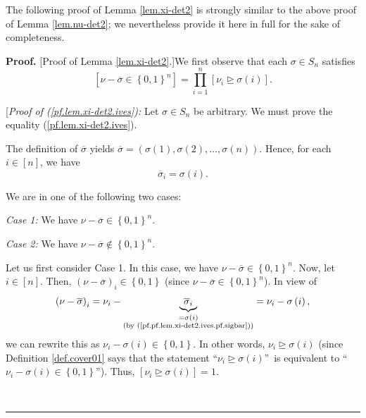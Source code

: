 \documentclass
[numbers=enddot,12pt,final,onecolumn,notitlepage,english]{scrartcl}%
\theoremstyle{definition}
\newenvironment{proof}[1][Proof]{\noindent\textbf{#1.} }{\ \rule{0.5em}{0.5em}}
\let\prodnonlimits\prod
\renewcommand{\prod}{\prodnonlimits\limits}
\newenvironment{verlong}{}{}
\begin{document}
\begin{verlong}
The following proof of Lemma \ref{lem.xi-det2} is strongly similar to the
above proof of Lemma \ref{lem.nu-det2}; we nevertheless provide it here in
full for the sake of completeness.

\begin{proof}
[Proof of Lemma \ref{lem.xi-det2}.]We first observe that each $\sigma\in
S_{n}$ satisfies%
\begin{equation}
\left[  \nu-\overline{\sigma}\in\left\{  0,1\right\}  ^{n}\right]
=\prod_{i=1}^{n}\left[  \nu_{i}\trianglerighteq\sigma\left(  i\right)
\right]  . \label{pf.lem.xi-det2.ives}%
\end{equation}


[\textit{Proof of (\ref{pf.lem.xi-det2.ives}):} Let $\sigma\in S_{n}$ be
arbitrary. We must prove the equality (\ref{pf.lem.xi-det2.ives}).

The definition of $\overline{\sigma}$ yields $\overline{\sigma}=\left(
\sigma\left(  1\right)  ,\sigma\left(  2\right)  ,\ldots,\sigma\left(
n\right)  \right)  $. Hence, for each $i\in\left[  n\right]  $, we have%
\begin{equation}
\overline{\sigma}_{i}=\sigma\left(  i\right)  .
\label{pf.pf.lem.xi-det2.ives.pf.sigbar}%
\end{equation}


We are in one of the following two cases:

\textit{Case 1:} We have $\nu-\overline{\sigma}\in\left\{  0,1\right\}  ^{n}$.

\textit{Case 2:} We have $\nu-\overline{\sigma}\notin\left\{  0,1\right\}
^{n}$. \medskip

Let us first consider Case 1. In this case, we have $\nu-\overline{\sigma}%
\in\left\{  0,1\right\}  ^{n}$. Now, let $i\in\left[  n\right]  $. Then,
$\left(  \nu-\overline{\sigma}\right)  _{i}\in\left\{  0,1\right\}  $ (since
$\nu-\overline{\sigma}\in\left\{  0,1\right\}  ^{n}$). In view of
\[
\left(  \nu-\overline{\sigma}\right)  _{i}=\nu_{i}-\underbrace{\overline
{\sigma}_{i}}_{\substack{=\sigma\left(  i\right)  \\\text{(by
(\ref{pf.pf.lem.xi-det2.ives.pf.sigbar}))}}}=\nu_{i}-\sigma\left(  i\right)
,
\]
we can rewrite this as $\nu_{i}-\sigma\left(  i\right)  \in\left\{
0,1\right\}  $. In other words, $\nu_{i}\trianglerighteq\sigma\left(
i\right)  $ (since Definition \ref{def.cover01} says that the statement
\textquotedblleft$\nu_{i}\trianglerighteq\sigma\left(  i\right)
$\textquotedblright\ is equivalent to \textquotedblleft$\nu_{i}-\sigma\left(
i\right)  \in\left\{  0,1\right\}  $\textquotedblright). Thus, $\left[
\nu_{i}\trianglerighteq\sigma\left(  i\right)  \right]  =1$.


\end{proof}
\end{verlong}
\end{document}
